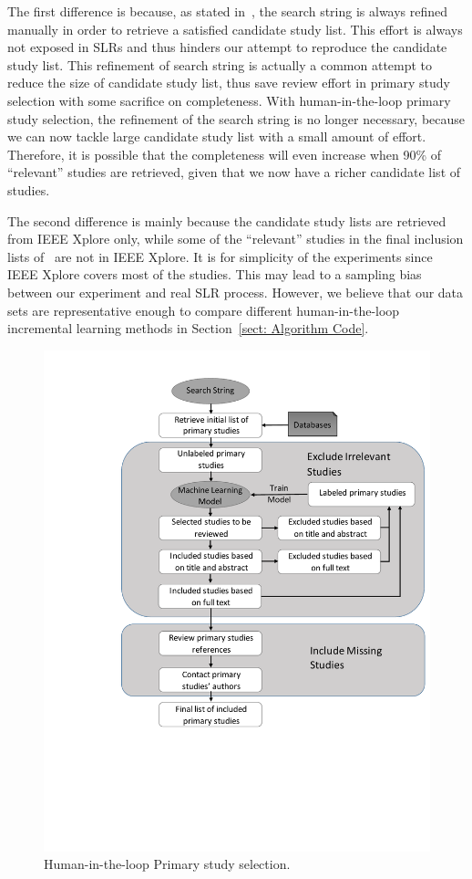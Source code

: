 \documentclass{svjour3}
\theoremstyle{break}
\begin{document}
The first difference is because, as stated in~\cite{wahono2015systematic}, the search string is always refined manually in order to retrieve a satisfied candidate study list. This effort is always not exposed in SLRs and thus hinders our attempt to reproduce the candidate study list. This refinement of search string is actually a common attempt to reduce the size of candidate study list, thus save review effort in primary study selection with some sacrifice on completeness. With human-in-the-loop primary study selection, the refinement of the search string is no longer necessary, because we can now tackle large candidate study list with a small amount of effort. Therefore, it is possible that the completeness will even increase when 90\% of ``relevant'' studies are retrieved, given that we now have a richer candidate list of studies.

The second difference is mainly because the candidate study lists are retrieved from IEEE Xplore only, while some of the ``relevant'' studies in the final inclusion lists of~\cite{wahono2015systematic,hall2012systematic} are not in IEEE Xplore. It is for simplicity of the experiments since IEEE Xplore covers most of the studies. This may lead to a sampling bias between our experiment and real SLR process. However, we believe that our data sets are representative enough to compare different human-in-the-loop incremental learning methods in Section~\ref{sect: Algorithm Code}.


\begin{figure}[t]
    \centering
    \includegraphics[width=0.6\linewidth]{Learning_based_primary_study_selection.pdf}
    \caption{Human-in-the-loop Primary study selection.}
    \label{fig: learning}
\end{figure}
\end{document}
